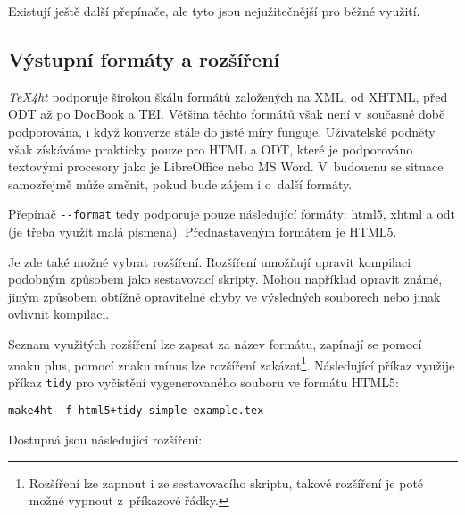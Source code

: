 \documentclass{csbulletin}
\newcommand\nazev[1]{\textit{#1}}
\newcommand\prikaz[1]{\texttt{#1}}
\newcommand\prepinac[1]{\texttt{-\/-#1}}
\begin{document}
Existují ještě další přepínače, ale tyto jsou nejužitečnější pro běžné využití.

\subsection{Výstupní formáty a rozšíření}

\nazev{TeX4ht} podporuje širokou škálu formátů založených na XML, od XHTML,
před ODT až po DocBook a TEI. Většina těchto formátů však není v~současné době
podporována, i když konverze stále do jisté míry funguje. Uživatelské podněty
však získáváme prakticky pouze pro HTML a ODT, které je podporováno textovými
procesory jako je LibreOffice nebo MS Word. V~budoucnu se situace samozřejmě
může změnit, pokud bude zájem i o~další formáty.

Přepínač \prepinac{format} tedy podporuje pouze následující formáty: html5,
xhtml a odt (je třeba využít malá písmena). Přednastaveným formátem je HTML5.

Je zde také možné vybrat rozšíření. Rozšíření umožňují upravit kompilaci
podobným způsobem jako sestavovací skripty. Mohou například opravit známé,
jiným způsobem obtížně opravitelné chyby ve výsledných souborech nebo jinak
ovlivnit kompilaci.

Seznam využitých rozšíření lze zapsat za název formátu, zapínají se pomocí
znaku plus, pomocí znaku mínus lze rozšíření zakázat\footnote{Rozšíření lze
  zapnout i ze sestavovacího skriptu, takové rozšíření je poté možné vypnout
z~příkazové řádky.}. Následující příkaz využije příkaz \prikaz{tidy} pro
vyčistění vygenerovaného souboru ve formátu HTML5:

\begin{verbatim}
make4ht -f html5+tidy simple-example.tex
\end{verbatim}

Dostupná jsou následující rozšíření:
\end{document}
